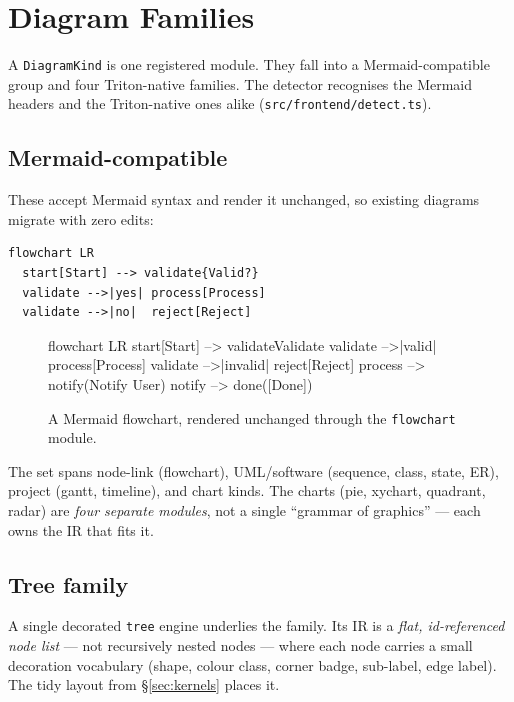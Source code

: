 \section{Diagram Families}
\label{sec:families}

A \texttt{DiagramKind} is one registered module. They fall into a Mermaid-compatible
group and four Triton-native families. The detector recognises the Mermaid headers
and the Triton-native ones alike (\texttt{src/frontend/detect.ts}).

\subsection{Mermaid-compatible}

These accept Mermaid syntax and render it unchanged, so existing diagrams migrate
with zero edits:

\begin{lstlisting}[language=triton]
flowchart LR
  start[Start] --> validate{Valid?}
  validate -->|yes| process[Process]
  validate -->|no|  reject[Reject]
\end{lstlisting}

\begin{figure}[htbp]
  \centering
\begin{triton}
flowchart LR
  start[Start] --> validate{Validate}
  validate -->|valid| process[Process]
  validate -->|invalid| reject[Reject]
  process --> notify(Notify User)
  notify --> done([Done])
\end{triton}
  \caption{A Mermaid flowchart, rendered unchanged through
the \texttt{flowchart} module.}
\end{figure}

The set spans node-link (flowchart), UML/software (sequence, class, state, ER),
project (gantt, timeline), and chart kinds. The charts (pie, xychart, quadrant,
radar) are \emph{four separate modules}, not a single ``grammar of graphics'' ---
each owns the IR that fits it.

\subsection{Tree family}

A single decorated \texttt{tree} engine underlies the family. Its IR is a
\emph{flat, id-referenced node list} --- not recursively nested nodes --- where
each node carries a small decoration vocabulary (shape, colour class, corner
badge, sub-label, edge label). The tidy layout from \S\ref{sec:kernels} places it.

